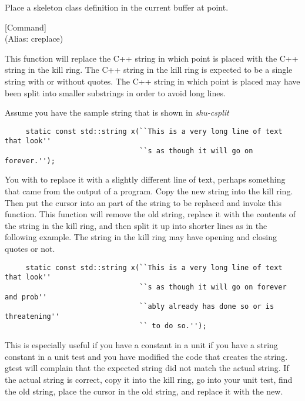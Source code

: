 \begin{doc-string}
Place a skeleton class definition in the current buffer at point.
\end{doc-string}

\vspace{1em}
\noindent
{}
\usebox{\funcname}
 \hfill [Command]\\%
 (Alias: creplace)

\begin{doc-string}
This function will replace the C++ string in which point is placed with the
C++ string in the kill ring.  The C++ string in the kill ring is expected to be
a single string with or without quotes.  The C++ string in which point is placed
may have been split into smaller substrings in order to avoid long lines.

Assume you have the sample string that is shown in \emph{shu-csplit}

\small{\begin{verbatim}
     static const std::string x(``This is a very long line of text that look''
                                ``s as though it will go on forever.'');
\end{verbatim}}

You with to replace it with a slightly different line of text, perhaps something
that came from the output of a program.  Copy the new string into the kill ring.
Then put the cursor into an part of the string to be replaced and invoke this
function.  This function will remove the old string, replace it with the
contents of the string in the kill ring, and then split it up into shorter lines
as in the following example.  The string in the kill ring may have opening and
closing quotes or not.

\small{\begin{verbatim}
     static const std::string x(``This is a very long line of text that look''
                                ``s as though it will go on forever and prob''
                                ``ably already has done so or is threatening''
                                `` to do so.'');
\end{verbatim}}

This is especially useful if you have a constant in a unit if you have a string
constant in a unit test and you have modified the code that creates the string.
gtest will complain that the expected string did not match the actual string.
If the actual string is correct, copy it into the kill ring, go into your unit
test, find the old string, place the cursor in the old string, and replace it
with the new.
\end{doc-string}

